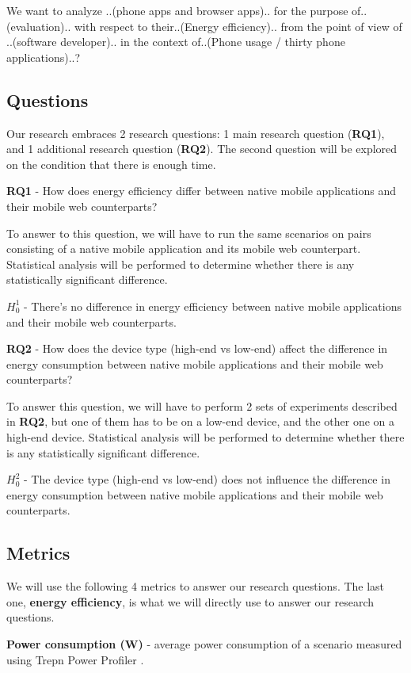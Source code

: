 We want to analyze ..(phone apps and browser apps).. for the purpose of..(evaluation).. with respect to their..(Energy efficiency).. from the point of view of ..(software developer).. in the context of..(Phone usage / thirty phone applications)..?

\subsection{Questions}
Our research embraces 2 research questions: 1 main research question (\textbf{RQ1}), and 1 additional research question (\textbf{RQ2}). The second question will be explored on the condition that there is enough time.

\textbf{RQ1} - How does energy efficiency differ between native mobile applications and their mobile web counterparts?

To answer to this question, we will have to run the same scenarios on pairs consisting of a native mobile application and its mobile web counterpart. Statistical analysis will be performed to determine whether there is any statistically significant difference.

$H_0^1$ - There's no difference in energy efficiency between native mobile applications and their mobile web counterparts.

\textbf{RQ2} - How does the device type (high-end vs low-end) affect the difference in energy consumption between native mobile applications and their mobile web counterparts?

To answer this question, we will have to perform 2 sets of experiments described in \textbf{RQ2}, but one of them has to be on a low-end device, and the other one on a high-end device. Statistical analysis will be performed to determine whether there is any statistically significant difference.

$H_0^2$ - The device type (high-end vs low-end) does not influence the difference in energy consumption between native mobile applications and their mobile web counterparts.

\subsection{Metrics}
We will use the following 4 metrics to answer our research questions. The last one, \textbf{energy efficiency}, is what we will directly use to answer our research questions.

\textbf{Power consumption (W)} - average power consumption of a scenario measured using Trepn Power Profiler \cite{trepn}.

